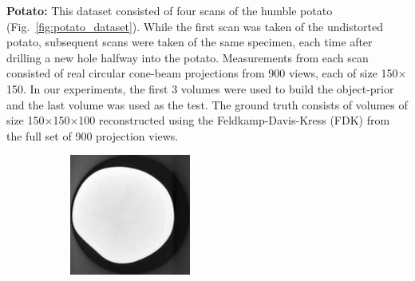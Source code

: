 \documentclass[journal]{IEEEtran}
\begin{document}
\textbf{Potato:} This dataset consisted of four scans of the humble
potato (Fig.~\ref{fig:potato_dataset}). While the first
scan was taken of the undistorted potato, subsequent scans were taken
of the same specimen, each time after drilling a new hole halfway into
the potato. Measurements from each scan consisted of real circular
cone-beam projections from 900 views, each of size
150$\times$150. %
In our experiments,
the first 3 volumes were used to build the object-prior and the last
volume was used as the test. The ground truth consists of volumes of
size 150$\times$150$\times$100 reconstructed using the 
Feldkamp-Davis-Kress (FDK) from the full
set of 900 projection views.
\begin{figure}[!h]
    \begin{subfigure}[b]{0.24\linewidth}
        \includegraphics[width=\textwidth]{../images/potato/template_1.png}
\captionsetup{labelformat=empty}       
 \caption{}
    \end{subfigure}
    \begin{subfigure}[b]{0.24\linewidth}

\end{subfigure}
\end{figure}
\end{document}
